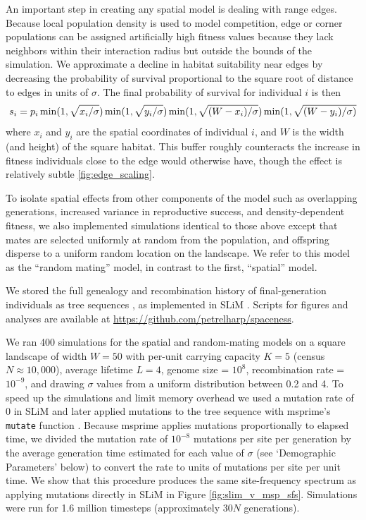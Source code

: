 \documentclass[10pt,twoside,lineno,hidelinks]{preprint}
\begin{document}
An important step in creating any spatial model is dealing with range edges. 
Because local population density is used to model competition, edge or corner populations can be assigned artificially high fitness values 
because they lack neighbors within their interaction radius but outside the bounds of the simulation.
We approximate a decline in habitat suitability near edges by decreasing the probability of survival proportional to the square root of distance to edges in units of $\sigma$. 
The final probability of survival for individual $i$ is then
\begin{equation}
    s_{i} = p_{i} 
        \min(1,\sqrt{x_{i}/\sigma})
        \min(1,\sqrt{y_{i}/\sigma})\\
        \min(1,\sqrt{(W - x_{i})/\sigma})
        \min(1,\sqrt{(W - y_{i})/\sigma)}
\end{equation}
where $x_i$ and $y_i$ are the spatial coordinates of individual $i$, and $W$ is the width (and height) of the square habitat.
This buffer roughly counteracts the increase in fitness individuals close to the edge would otherwise have, though the effect is relatively subtle \ref{fig:edge_scaling}.

To isolate spatial effects from other components of the model such as overlapping generations, increased variance in reproductive success, and density-dependent fitness, 
we also implemented simulations identical to those above except that mates are selected uniformly at random from the population,
and offspring disperse to a uniform random location on the landscape. 
We refer to this model as the ``random mating'' model, in contrast to the first, ``spatial'' model. 

We stored the full genealogy and recombination history of final-generation individuals as tree sequences \citep{Kelleher2018},
as implemented in SLiM \citep{haller2019treesequence}. 
Scripts for figures and analyses are available at \url{https://github.com/petrelharp/spaceness}.  

We ran 400 simulations for the spatial and random-mating models on a square landscape of width $W=50$  
with per-unit carrying capacity $K=5$ (census $N \approx 10,000$), 
average lifetime $L=4$, 
genome size = $10^{8}$, 
recombination rate = $10^{-9}$, 
and drawing $\sigma$ values from a uniform distribution between 0.2 and 4. 
To speed up the simulations and limit memory overhead we used a mutation rate of 0 in SLiM 
and later applied mutations to the tree sequence with msprime's \texttt{mutate} function \citep{Kelleher2016}. 
Because msprime applies mutations proportionally to elapsed time,
we divided the mutation rate of $10^{-8}$ mutations per site per generation
by the average generation time estimated for each value of $\sigma$ (see `Demographic Parameters' below) to convert the rate to units of mutations per site per unit time.
We show that this procedure produces the same site-frequency spectrum as applying mutations directly in SLiM in Figure \ref{fig:slim_v_msp_sfs}. Simulations were run for 1.6 million timesteps (approximately $30N$ generations). 
\end{document}
